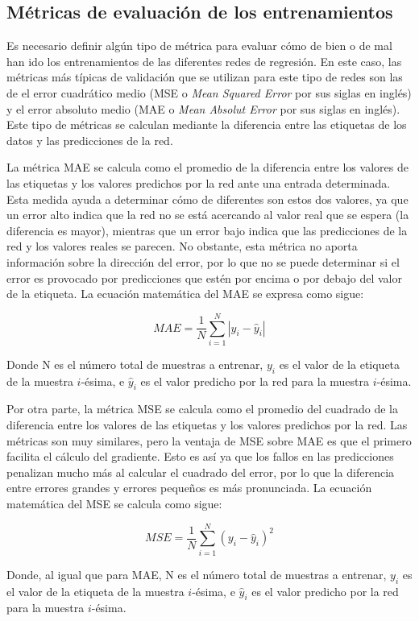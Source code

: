 \subsection{Métricas de evaluación de los entrenamientos}
\label{sec:metrics}

Es necesario definir algún tipo de métrica para evaluar cómo de bien o de mal han ido los entrenamientos de las diferentes redes de regresión. En este caso, las métricas más típicas de validación que se utilizan para este tipo de redes son las de el error cuadrático medio (MSE o \textit{Mean Squared Error} por sus siglas en inglés) y el error absoluto medio (MAE o \textit{Mean Absolut Error} por sus siglas en inglés). Este tipo de métricas se calculan mediante la diferencia entre las etiquetas de los datos y las predicciones de la red.

La métrica MAE se calcula como el promedio de la diferencia entre los valores de las etiquetas y los valores predichos por la red ante una entrada determinada. Esta medida ayuda a determinar cómo de diferentes son estos dos valores, ya que un error alto indica que la red no se está acercando al valor real que se espera (la diferencia es mayor), mientras que un error bajo indica que las predicciones de la red y los valores reales se parecen. No obstante, esta métrica no aporta información sobre la dirección del error, por lo que no se puede determinar si el error es provocado por predicciones que estén por encima o por debajo del valor de la etiqueta. La ecuación matemática del MAE se expresa como sigue:

$$MAE=\frac{1}{N}\sum_{i=1}^{N}|y_i-\hat y_i|$$

Donde N es el número total de muestras a entrenar, $y_i$ es el valor de la etiqueta de la muestra $i$-ésima, e $\hat y_i$ es el valor predicho por la red para la muestra $i$-ésima.

Por otra parte, la métrica MSE se calcula como el promedio del cuadrado de la diferencia entre los valores de las etiquetas y los valores predichos por la red. Las métricas son muy similares, pero la ventaja de MSE sobre MAE es que el primero facilita el cálculo del gradiente. Esto es así ya que los fallos en las predicciones penalizan mucho más al calcular el cuadrado del error, por lo que la diferencia entre errores grandes y errores pequeños es más pronunciada. La ecuación matemática del MSE se calcula como sigue:

$$MSE=\frac{1}{N}\sum_{i=1}^{N}(y_i-\hat y_i)^2$$

Donde, al igual que para MAE, N es el número total de muestras a entrenar, $y_i$ es el valor de la etiqueta de la muestra $i$-ésima, e $\hat y_i$ es el valor predicho por la red para la muestra $i$-ésima.

